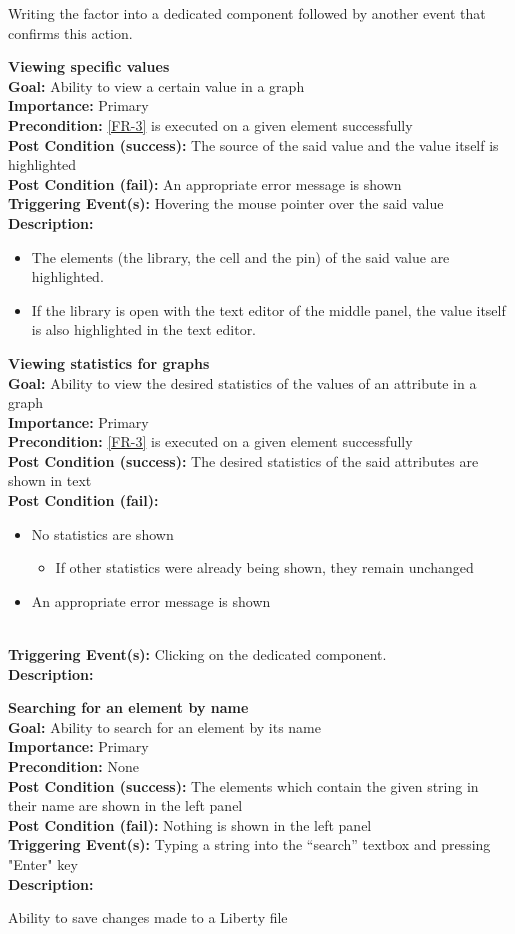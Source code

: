 \documentclass[10pt,a4paper]{report}
\newcommand{\precondition}[1]{
    \textbf{Precondition: } #1 \leavevmode \\
}
\newcommand{\FRDescription}[8]{
    \textbf{#1} \leavevmode \\
    \textbf{Goal: } #2 \leavevmode \\
    \textbf{Importance: } #3 \leavevmode \\
    \precondition{#4}
    \textbf{Post Condition (success): } #5 \leavevmode \\
    \textbf{Post Condition (fail): } #6 \leavevmode \\
    \textbf{Triggering Event(s): } #7 \leavevmode \\
    \textbf{Description: } \leavevmode \\ 
    #8}
\begin{document}
\begin{FR}
{\begin{itemize}
\begin{itemize}
\begin{itemize}
            \end{itemize}
        \end{itemize}
    \end{itemize}}
    {Writing the factor into a dedicated component followed by another event that confirms this action.}
    \item \FRDescription{Viewing specific values}
    {Ability to view a certain value in a graph}
    {Primary}
    {\ref{FR-3} is executed on a given element successfully}
    {The source of the said value and the value itself is highlighted}
    {An appropriate error message is shown}
    {Hovering the mouse pointer over the said value}
    {\begin{itemize}
        \item The elements (the library, the cell and the pin) of the said value are highlighted.
        \item If the library is open with the text editor of the middle panel, the value itself is also highlighted in the text editor.
    \end{itemize}}
    \item \FRDescription{Viewing statistics for graphs} %
    {Ability to view the desired statistics of the values of an attribute in a graph}
    {Primary}
    {\ref{FR-3} is executed on a given element successfully}
    {The desired statistics of the said attributes are shown in text}
    {\begin{itemize}
        \item No statistics are shown
        \begin{itemize}
            \item If other statistics were already being shown, they remain unchanged
        \end{itemize}
        \item An appropriate error message is shown
    \end{itemize}}
    {Clicking on the dedicated component.}
    \item \FRDescription{Searching for an element by name}
    {Ability to search for an element by its name}
    {Primary}
    {None}
    {The elements which contain the given string in their name are shown in the left panel}
    {Nothing is shown in the left panel}
    {Typing a string into the “search” textbox and pressing "Enter" key}
    \item {}
    {Ability to save changes made to a Liberty file}

\end{FR}
\end{document}
